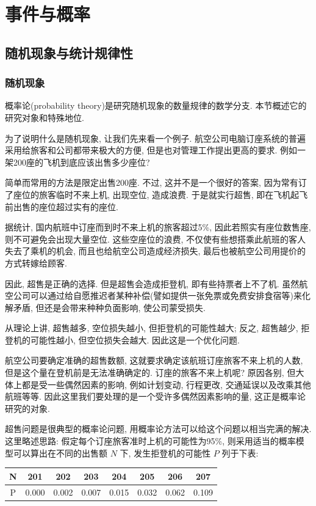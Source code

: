 \documentclass[../../main.tex]{subfiles}
\begin{document}
\chapter{事件与概率}

\section{随机现象与统计规律性}

\subsection{随机现象}

概率论(probability theory)是研究随机现象的数量规律的数学分支. 本节概述它的研究对象和特殊地位. 

为了说明什么是随机现象, 让我们先来看一个例子. 航空公司电脑订座系统的普遍采用给旅客和公司都带来极大的方便, 但是也对管理工作提出更高的要求. 例如一架200座的飞机到底应该出售多少座位? 

简单而常用的方法是限定出售200座. 不过, 这并不是一个很好的答案, 因为常有订了座位的旅客临时不来上机, 出现空位, 造成浪费. 于是就实行超售, 即在飞机起飞前出售的座位超过实有的座位. 

据统计, 国内航班中订座而到时不来上机的旅客超过5\%, 因此若照实有座位数售座, 则不可避免会出现大量空位. 这些空座位的浪费, 不仅使有些想搭乘此航班的客人失去了乘机的机会, 而且也给航空公司造成经济损失, 最后也被航空公司用提价的方式转嫁给顾客. 

因此, 超售是正确的选择. 但是超售会造成拒登机, 即有些持票者上不了机. 虽然航空公司可以通过给自愿推迟者某种补偿(譬如提供一张免票或免费安排食宿等)来化解矛盾, 但还是会带来种种负面影响, 使公司蒙受损失. 

从理论上讲, 超售越多, 空位损失越小, 但拒登机的可能性越大; 反之, 超售越少, 拒登机的可能性越小, 但空位损失会越大. 因此这是一个优化问题. 

航空公司要确定准确的超售数额, 这就要求确定该航班订座旅客不来上机的人数, 但是这个量在登机前是无法准确确定的. 订座的旅客不来上机呢? 原因各别, 但大体上都是受一些偶然因素的影响, 例如计划变动, 行程更改, 交通延误以及改乘其他航班等等. 因此这里我们要处理的是一个受许多偶然因素影响的量, 这正是概率论研究的对象. 

超售问题是很典型的概率论问题, 用概率论方法可以给这个问题以相当完满的解决. 这里略述思路: 假定每个订座旅客准时上机的可能性为95\%, 则采用适当的概率模型可以算出在不同的出售额 $N$ 下, 发生拒登机的可能性 $P$ 列于下表: 

\begin{table}[htbp]
    \centering
    \begin{tabular}{c|ccccccc}
        \hline
        N & 201 & 202 & 203 & 204 & 205 & 206 & 207 \\
        \hline
        P & 0.000 & 0.002 & 0.007 & 0.015 & 0.032 & 0.062 & 0.109 \\
        \hline
    \end{tabular}
\end{table}
\end{document}
